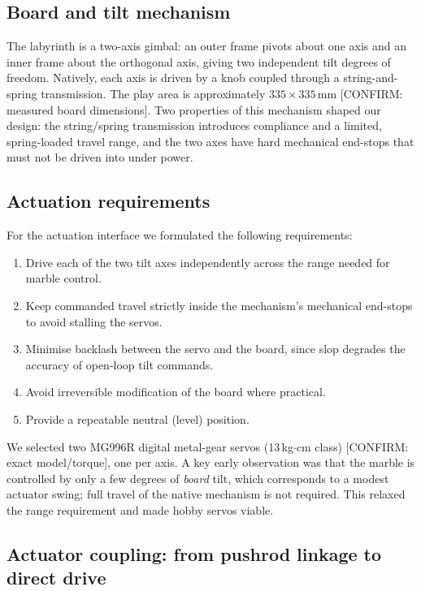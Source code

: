 \subsection{Board and tilt mechanism}
\label{sec:mech-board}

The labyrinth is a two-axis gimbal: an outer frame pivots about one axis and an
inner frame about the orthogonal axis, giving two independent tilt degrees of
freedom. Natively, each axis is driven by a knob coupled through a
string-and-spring transmission. The play area is approximately
$335\times335$\,mm [CONFIRM: measured board dimensions]. Two properties of this
mechanism shaped our design: the string/spring transmission introduces
compliance and a limited, spring-loaded travel range, and the two axes have
hard mechanical end-stops that must not be driven into under power.

\subsection{Actuation requirements}
\label{sec:mech-req}

For the actuation interface we formulated the following requirements:

\begin{enumerate}
  \item Drive each of the two tilt axes independently across the range needed
    for marble control.
  \item Keep commanded travel strictly inside the mechanism's mechanical
    end-stops to avoid stalling the servos.
  \item Minimise backlash between the servo and the board, since slop degrades
    the accuracy of open-loop tilt commands.
  \item Avoid irreversible modification of the board where practical.
  \item Provide a repeatable neutral (level) position.
\end{enumerate}

We selected two MG996R digital metal-gear servos (13\,kg$\cdot$cm class)
[CONFIRM: exact model/torque], one per axis. A key early observation was that
the marble is controlled by only a few degrees of \emph{board} tilt, which
corresponds to a modest actuator swing; full travel of the native mechanism is
not required. This relaxed the range requirement and made hobby servos viable.

\subsection{Actuator coupling: from pushrod linkage to direct drive}
\label{sec:mech-linkage}

